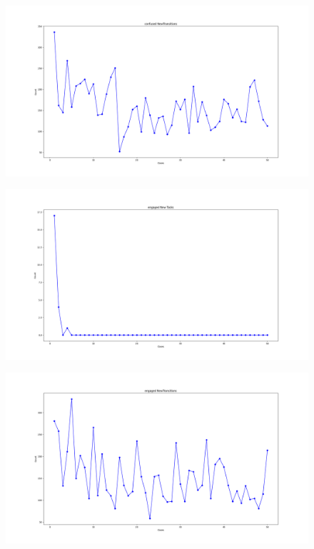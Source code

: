 \begin{figure}
    \centering   
    \includegraphics[width=1\linewidth]{images/confused NewTransitions.png}
\end{figure}\clearpage
\begin{figure}
    \centering   
    \includegraphics[width=1\linewidth]{images/engaged New Tasks.png}
\end{figure}
\begin{figure}
    \centering   
    \includegraphics[width=1\linewidth]{images/engaged NewTransitions.png}
\end{figure}\clearpage
